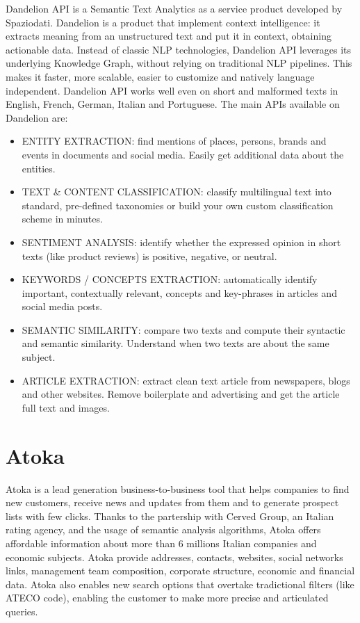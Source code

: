 Dandelion API is a Semantic Text Analytics as a service product developed by Spaziodati.
Dandelion is a product that implement context intelligence: it extracts meaning from an unstructured text and put it in context, obtaining actionable data.
Instead of classic NLP technologies, Dandelion API leverages its underlying Knowledge Graph, without relying on traditional NLP pipelines. This makes it faster, more scalable, easier to customize and natively language independent. Dandelion API works well even on short and malformed texts in English, French, German, Italian and Portuguese.
The main APIs available on Dandelion are: 
\begin{itemize}
    \item ENTITY EXTRACTION: find mentions of places, persons, brands and events in documents and social media. Easily get additional data about the entities.
    \item TEXT \& CONTENT CLASSIFICATION: classify multilingual text into standard, pre-defined taxonomies or build your own custom classification scheme in minutes.
    \item SENTIMENT ANALYSIS: identify whether the expressed opinion in short texts (like product reviews) is positive, negative, or neutral.
    \item KEYWORDS / CONCEPTS EXTRACTION: automatically identify important, contextually relevant, concepts and key-phrases in articles and social media posts.
    \item SEMANTIC SIMILARITY: compare two texts and compute their syntactic and semantic similarity. Understand when two texts are about the same subject.
    \item ARTICLE EXTRACTION: extract clean text article from newspapers, blogs and other websites. Remove boilerplate and advertising and get the article full text and images.
\end{itemize}

\section{Atoka}

Atoka is a lead generation business-to-business tool that helps companies to find new customers, receive news and updates from them and to generate prospect lists with few clicks.
Thanks to the partership with Cerved Group, an Italian rating agency, and the usage of semantic analysis algorithms, Atoka offers affordable information about more than 6 millions Italian companies and economic subjects.
Atoka provide addresses, contacts, websites, social networks links, management  team composition, corporate structure, economic and financial data.
Atoka also enables new search options that overtake tradictional filters (like ATECO code), enabling the customer to make more precise and articulated queries.

